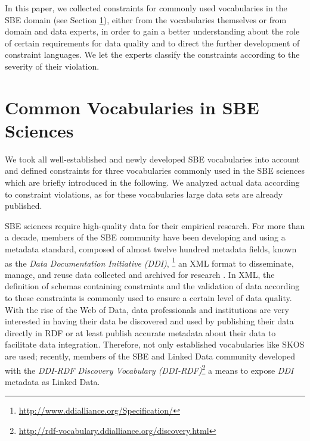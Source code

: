\documentclass{llncs}
\begin{document}
In this paper, we collected constraints for commonly used vocabularies in the SBE domain (see Section \ref{sbe-vocabularies}), either from the vocabularies themselves or from domain and data experts, in order to gain a better understanding about the role of certain requirements for data quality and to direct the further development of constraint languages. 
We let the experts classify the constraints according to the severity of their violation. 

\section{Common Vocabularies in SBE Sciences}
\label{sbe-vocabularies}

We took all well-established and newly developed SBE vocabularies into account and defined constraints for three vocabularies commonly used in the SBE sciences which are briefly introduced in the following. We analyzed actual data according to constraint violations, as for these vocabularies large data sets are already published.

SBE sciences require high-quality data for their empirical research. For more than a decade, members of the SBE community have been developing and using a
metadata standard, composed of almost twelve hundred metadata fields, known as the \emph{Data Documentation Initiative (DDI)}, \footnote{\url{http://www.ddialliance.org/Specification/}}
an XML format to disseminate, manage,
and reuse data collected and archived for research \cite{Vardigan2008}. 
In XML, the definition of schemas containing constraints and the validation of data according to these constraints is commonly used to ensure a certain level of data quality.
With the rise of the Web of Data, data professionals and institutions are very interested in having their data be discovered and used by publishing their data directly in RDF or at least publish accurate metadata about their data to facilitate data integration. Therefore, not only established vocabularies like SKOS are used; 
recently, members of the SBE and Linked Data community developed with the \emph{DDI-RDF Discovery Vocabulary (DDI-RDF)}\footnote{\url{http://rdf-vocabulary.ddialliance.org/discovery.html}} a means to expose \emph{DDI} metadata as Linked Data. 
\end{document}
